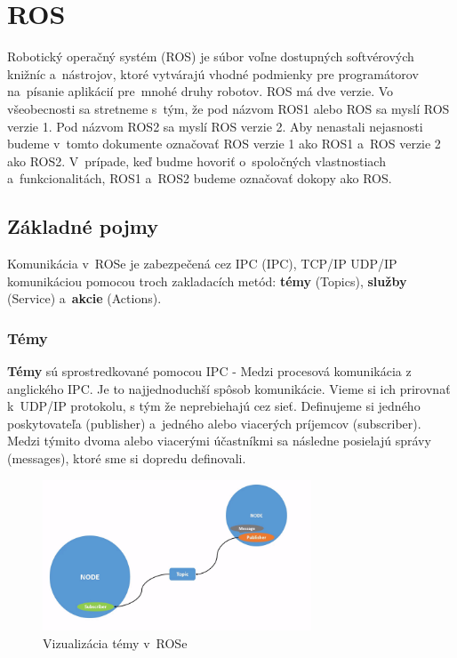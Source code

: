 \section{ROS}

\noindent Robotický operačný systém (\acrlong{ROS}) je súbor voľne dostupných softvérových knižníc a~nástrojov, ktoré vytvárajú
vhodné podmienky pre programátorov na~písanie aplikácií pre~mnohé druhy robotov. ROS má dve verzie. Vo všeobecnosti sa stretneme
s~tým, že pod názvom ROS1 alebo ROS sa myslí ROS verzie 1. Pod názvom ROS2 sa myslí ROS verzie 2. Aby nenastali nejasnosti
budeme v~tomto dokumente označovať ROS verzie 1 ako ROS1 a~ROS verzie 2 ako ROS2. V~prípade, keď budme hovoriť o~spoločných
vlastnostiach a~funkcionalitách, ROS1 a~ROS2 budeme označovať dokopy ako ROS.

\subsection{Základné pojmy}

\noindent Komunikácia v~ROSe je zabezpečená cez IPC (\acrlong{IPC}), TCP/IP UDP/IP komunikáciou pomocou troch zakladacích metód:
\textbf{témy} (Topics), \textbf{služby} (Service) a~\textbf{akcie} (Actions).

\subsubsection{Témy}
\label{sec:topic}

	\textbf {Témy} sú sprostredkované pomocou IPC - Medzi procesová komunikácia z anglického \acrlong{IPC}. Je to najjednoduchší spôsob
	komunikácie. Vieme si ich prirovnať k~UDP/IP protokolu, s tým že neprebiehajú cez sieť. Definujeme si jedného poskytovateľa (publisher)
	a~jedného alebo viacerých príjemcov (subscriber). Medzi týmito dvoma alebo viacerými účastníkmi sa následne posielajú správy (messages),
	ktoré sme si dopredu definovali.

	\begin{figure}[h]
		\centering
		\includegraphics[width=8cm]{img/topicsExplanation.png}
		\caption{Vizualizácia témy v~ROSe~\cite{RosDoc}}
		\label{fig:topics}
	\end{figure}

